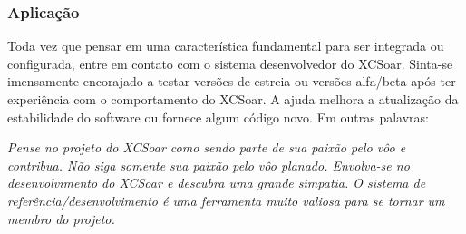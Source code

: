 \subsubsection*{Aplicação} Toda vez que pensar em uma característica fundamental para ser integrada ou configurada, entre em contato com o sistema desenvolvedor do XCSoar.  Sinta-se imensamente encorajado a testar versões de estreia ou versões alfa/beta após ter experiência com o comportamento do XCSoar.  A ajuda melhora a atualização da estabilidade do software ou fornece algum código novo.  Em outras palavras:

\textsl{Pense no projeto do XCSoar como sendo parte de sua paixão pelo vôo e contribua.  Não siga somente sua paixão pelo vôo planado.  Envolva-se no desenvolvimento do XCSoar e descubra uma grande simpatia.   O sistema de referência/desenvolvimento é uma ferramenta muito valiosa para se tornar um membro do projeto.}